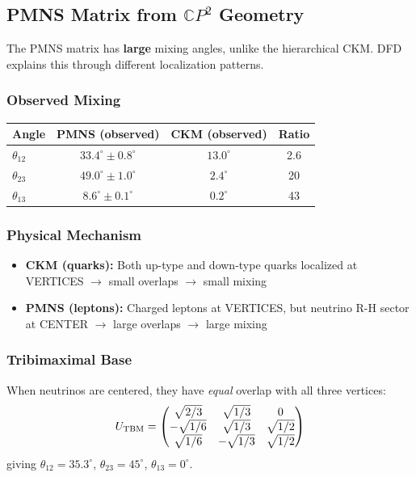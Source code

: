 \subsection{PMNS Matrix from $\mathbb{C}P^2$ Geometry}\label{sec:pmns-matrix}

The PMNS matrix has \textbf{large} mixing angles, unlike the hierarchical CKM. DFD explains this through different localization patterns.

\subsubsection{Observed Mixing}

\begin{center}
\renewcommand{\arraystretch}{1.2}
\begin{tabular}{lccc}
\toprule
Angle & PMNS (observed) & CKM (observed) & Ratio \\
\midrule
$\theta_{12}$ & $33.4^\circ \pm 0.8^\circ$ & $13.0^\circ$ & 2.6 \\
$\theta_{23}$ & $49.0^\circ \pm 1.0^\circ$ & $2.4^\circ$ & 20 \\
$\theta_{13}$ & $8.6^\circ \pm 0.1^\circ$ & $0.2^\circ$ & 43 \\
\bottomrule
\end{tabular}
\end{center}

\subsubsection{Physical Mechanism}

\begin{itemize}
\item \textbf{CKM (quarks):} Both up-type and down-type quarks localized at VERTICES $\to$ small overlaps $\to$ small mixing
\item \textbf{PMNS (leptons):} Charged leptons at VERTICES, but neutrino R-H sector at CENTER $\to$ large overlaps $\to$ large mixing
\end{itemize}

\subsubsection{Tribimaximal Base}

When neutrinos are centered, they have \textit{equal} overlap with all three vertices:
\begin{equation}
U_{\rm TBM} = \begin{pmatrix} 
\sqrt{2/3} & \sqrt{1/3} & 0 \\
-\sqrt{1/6} & \sqrt{1/3} & \sqrt{1/2} \\
\sqrt{1/6} & -\sqrt{1/3} & \sqrt{1/2}
\end{pmatrix}
\end{equation}
giving $\theta_{12} = 35.3^\circ$, $\theta_{23} = 45^\circ$, $\theta_{13} = 0^\circ$.

